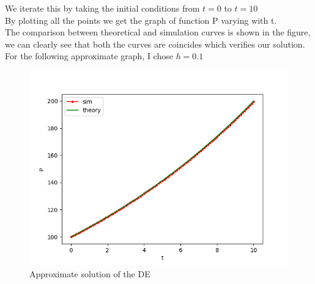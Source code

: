 \documentclass[journal]{IEEEtran}
\numberwithin{equation}{enumi}
\numberwithin{figure}{enumi}
\begin{document}
We iterate this by taking the initial conditions from $t = 0$ to $t = 10$\\
By plotting all the points  we get the graph of function P varying with t.\\
The comparison between theoretical and simulation curves is shown in the figure, we can clearly see that both the curves are coincides which verifies our solution.\\
For the following approximate graph, I chose $h = 0.1$

\begin{figure}[H]
   \centering
   \includegraphics[width=0.7\columnwidth]{figs/fig.png}
    \caption{Approximate solution of the DE}
\end{figure}
\end{document}
